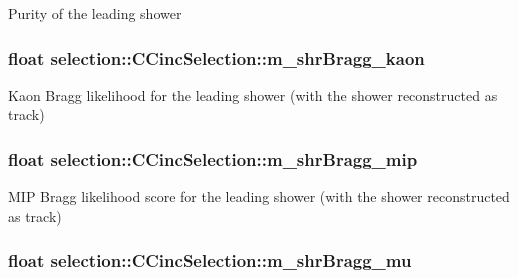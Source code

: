 Purity of the leading shower \hypertarget{classselection_1_1CCincSelection_a44d88e3b197705450db2becfae327827}{
\subsubsection[{m\-\_\-shr\-Bragg\-\_\-kaon}]{\setlength{\rightskip}{0pt plus 5cm}float selection\-::\-C\-Cinc\-Selection\-::m\-\_\-shr\-Bragg\-\_\-kaon\hspace{0.3cm}{\ttfamily [private]}}}\label{classselection_1_1CCincSelection_a44d88e3b197705450db2becfae327827}
Kaon Bragg likelihood for the leading shower (with the shower reconstructed as track) \hypertarget{classselection_1_1CCincSelection_a0d588b58345d52cc13a398bb3f6ff2fd}{
\subsubsection[{m\-\_\-shr\-Bragg\-\_\-mip}]{\setlength{\rightskip}{0pt plus 5cm}float selection\-::\-C\-Cinc\-Selection\-::m\-\_\-shr\-Bragg\-\_\-mip\hspace{0.3cm}{\ttfamily [private]}}}\label{classselection_1_1CCincSelection_a0d588b58345d52cc13a398bb3f6ff2fd}
M\-I\-P Bragg likelihood score for the leading shower (with the shower reconstructed as track) \hypertarget{classselection_1_1CCincSelection_abe0da2d66394a9583d9540f83a114901}{
\subsubsection[{m\-\_\-shr\-Bragg\-\_\-mu}]{\setlength{\rightskip}{0pt plus 5cm}float selection\-::\-C\-Cinc\-Selection\-::m\-\_\-shr\-Bragg\-\_\-mu\hspace{0.3cm}{\ttfamily [private]}}}\label{classselection_1_1CCincSelection_abe0da2d66394a9583d9540f83a114901}
